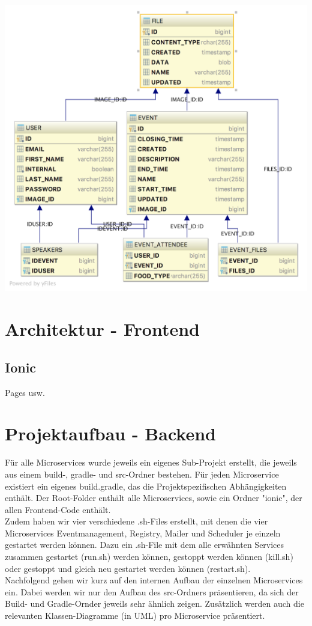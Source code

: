 \documentclass[11pt]{article} %
\begin{document}
\includegraphics[width=1\textwidth]{dbSchema}
\newpage
\section{Architektur - Frontend}
\subsection{Ionic}
Pages usw.

\newpage
\section{Projektaufbau - Backend}
Für alle Microservices wurde jeweils ein eigenes Sub-Projekt erstellt, die jeweils aus einem build-, gradle- und src-Ordner bestehen. Für jeden Microservice existiert ein eigenes build.gradle, das die Projektspezifischen Abhängigkeiten enthält.
Der Root-Folder enthält alle Microservices, sowie ein Ordner "ionic", der allen Frontend-Code enthält.
\\
Zudem haben wir vier verschiedene .sh-Files erstellt, mit denen die vier Microservices Eventmanagement, Registry, Mailer und Scheduler je einzeln gestartet werden können. Dazu ein .sh-File mit dem alle erwähnten Services zusammen gestartet (run.sh) werden können, gestoppt werden können (kill.sh) oder gestoppt und gleich neu gestartet werden können (restart.sh).
\\
Nachfolgend gehen wir kurz auf den internen Aufbau der einzelnen Microservices ein. Dabei werden wir nur den Aufbau des src-Ordners präsentieren, da sich der Build- und Gradle-Ornder jeweils sehr ähnlich zeigen. Zusätzlich werden auch die relevanten Klassen-Diagramme (in UML) pro Microservice präsentiert.
\end{document}
